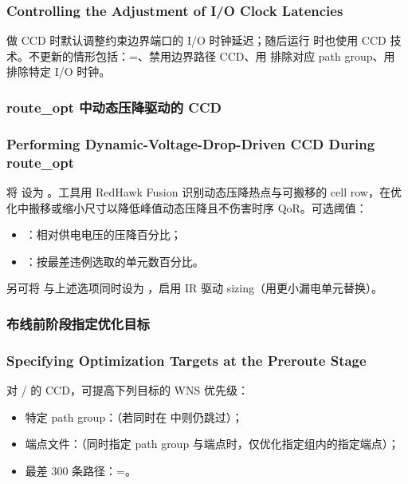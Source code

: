 \subsubsection*{Controlling the Adjustment of I/O Clock Latencies}

 做 CCD 时默认调整约束边界端口的 I/O 时钟延迟；随后运行  时也使用 CCD 技术。不更新的情形包括：=、禁用边界路径 CCD、用  排除对应 path group、用  排除特定 I/O 时钟。

\subsubsection{route\_opt 中动态压降驱动的 CCD}
\subsubsection*{Performing Dynamic-Voltage-Drop-Driven CCD During route\_opt}

将  设为 。工具用 RedHawk Fusion 识别动态压降热点与可搬移的 cell row，在优化中搬移或缩小尺寸以降低峰值动态压降且不伤害时序 QoR。可选阈值：
\begin{itemize}
  \item {}：相对供电电压的压降百分比；
  \item {}：按最差违例选取的单元数百分比。
\end{itemize}
另可将  与上述选项同时设为 ，启用 IR 驱动 sizing（用更小漏电单元替换）。

\subsubsection{布线前阶段指定优化目标}
\subsubsection*{Specifying Optimization Targets at the Preroute Stage}

对 / 的 CCD，可提高下列目标的 WNS 优先级：
\begin{itemize}
  \item 特定 path group：（若同时在  中则仍跳过）；
  \item 端点文件：（同时指定 path group 与端点时，仅优化指定组内的指定端点）；
  \item 最差 300 条路径：=。
\end{itemize}

